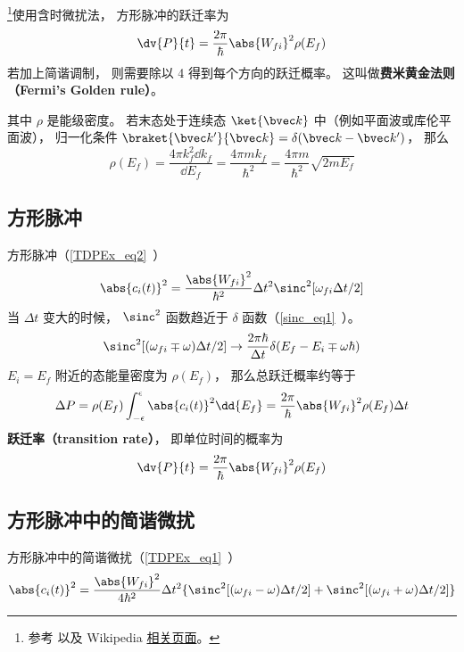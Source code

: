 

\footnote{参考 \cite{Bransden} 以及 Wikipedia \href{https://en.wikipedia.org/wiki/Fermi's_golden_rule}{相关页面}。}使用含时微扰法， 方形脉冲的跃迁率为
\begin{equation} %
\dv{P}{t} = \frac{2\pi}{\hbar} \abs{W_{fi}}^2\rho(E_f)
\end{equation}
若加上简谐调制， 则需要除以 4 得到每个方向的跃迁概率。 这叫做\textbf{费米黄金法则（Fermi's Golden rule）}。

其中 $\rho$ 是能级密度。 若末态处于连续态 $\ket{\bvec k}$ 中（例如平面波或库伦平面波）， 归一化条件 $\braket{\bvec k'}{\bvec k} = \delta(\bvec k - \bvec k')$， 那么
\begin{equation}
\rho(E_f) = \frac{4\pi k_f^2\dd{k_f}}{\dd{E_f}} = \frac{4\pi m k_f}{\hbar^2} = \frac{4\pi m}{\hbar^2}\sqrt{2mE_f}
\end{equation}

\subsection{方形脉冲}
方形脉冲（\autoref{TDPEx_eq2}~）
\begin{equation}
\abs{c_i(t)}^2 = \frac{\abs{W_{fi}}^2}{\hbar^2} \Delta t^2 \sinc^2[\omega_{fi}\Delta t/2]
\end{equation}
当 $\Delta t$ 变大的时候， $\sinc^2$ 函数趋近于 $\delta$ 函数（\autoref{sinc_eq1}~）。
\begin{equation}
\sinc^2[(\omega_{fi}\mp\omega)\Delta t/2] \to \frac{2\pi\hbar}{\Delta t}\delta(E_f - E_i \mp \omega\hbar)
\end{equation}
$E_i=E_f$ 附近的态能量密度为 $\rho(E_f)$， 那么总跃迁概率约等于
\begin{equation}
\Delta P = \rho(E_f)\int_{-\epsilon}^{\epsilon}\abs{c_i(t)}^2 \dd{E_f}
= \frac{2\pi}{\hbar} \abs{W_{fi}}^2\rho(E_f)\Delta t
\end{equation}
\textbf{跃迁率（transition rate）}， 即单位时间的概率为
\begin{equation}
\dv{P}{t} = \frac{2\pi}{\hbar} \abs{W_{fi}}^2\rho(E_f)
\end{equation}

\subsection{方形脉冲中的简谐微扰}
方形脉冲中的简谐微扰（\autoref{TDPEx_eq1}~）
\begin{equation}
\abs{c_i(t)}^2 = \frac{\abs{W_{fi}}^2}{4\hbar^2} \Delta t^2 \{\sinc^2[(\omega_{fi}-\omega)\Delta t/2] + \sinc^2[(\omega_{fi}+\omega)\Delta t/2]\}
\end{equation}

